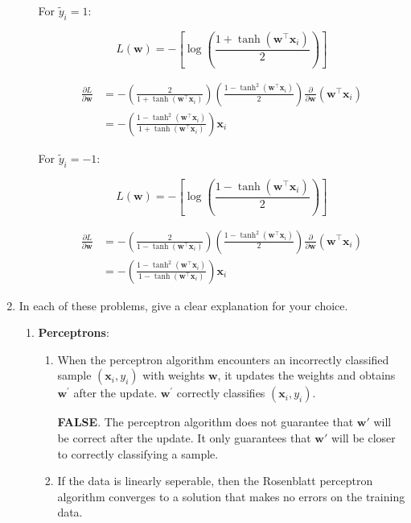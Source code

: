 \documentclass[letterpaper]{article}
\theoremstyle{definition}
\begin{document}
\begin{enumerate}
\begin{enumerate}
For \(\tilde{y}_i = 1\):

$$
      L(\mathbf{w}) = -\left[ \log \left(\frac{1+\tanh(\mathbf{w}^\top \mathbf{x}_i)}{2}\right)\right]
      $$

\begin{align*}
\frac{\partial L}{\partial \mathbf{w}} & = -\left( \frac{2}{1 + \tanh(\mathbf{w}^\top \mathbf{x}_i)} \right) \left(\frac{1 - \tanh^2(\mathbf{w}^\top \mathbf{x}_i)}{2}\right) \frac{\partial}{\partial \mathbf{w}} (\mathbf{w}^\top \mathbf{x}_i) \\
& = -\left( \frac{1 - \tanh^2(\mathbf{w}^\top \mathbf{x}_i)}{1 + \tanh(\mathbf{w}^\top \mathbf{x}_i)} \right) \mathbf{x}_i
\end{align*}

For \(\tilde{y}_i = -1\):

$$
      L(\mathbf{w}) = -\left[ \log \left(\frac{1-\tanh(\mathbf{w}^\top \mathbf{x}_i)}{2}\right)\right]
      $$

\begin{align*}
\frac{\partial L}{\partial \mathbf{w}} & = -\left( \frac{2}{1 - \tanh(\mathbf{w}^\top \mathbf{x}_i)} \right) \left(\frac{1 - \tanh^2(\mathbf{w}^\top \mathbf{x}_i)}{2}\right) \frac{\partial}{\partial \mathbf{w}} (\mathbf{w}^\top \mathbf{x}_i) \\
& = -\left( \frac{1 - \tanh^2(\mathbf{w}^\top \mathbf{x}_i)}{1 - \tanh(\mathbf{w}^\top \mathbf{x}_i)} \right) \mathbf{x}_i
\end{align*}
\end{enumerate}

\item In each of these problems, give a clear explanation for your choice.

\begin{enumerate}
\item \textbf{Perceptrons}:

\begin{enumerate}
\item When the perceptron algorithm encounters an incorrectly classified sample \(\left(\mathbf{x}_{i}, y_{i}\right)\) with weights \(\mathbf{w}\), it updates the weights and obtains \(\mathbf{w}^{\prime}\) after the update. \(\mathbf{w}^{\prime}\) correctly classifies \(\left(\mathbf{x}_{i}, y_{i}\right)\).

\color{teal}
\textbf{FALSE}. The perceptron algorithm does not guarantee that \(\mathbf{w}'\) will be correct
after the update. It only guarantees that \(\mathbf{w}'\) will be closer to correctly
classifying a sample.
\color{black}
\item If the data is linearly seperable, then the Rosenblatt perceptron algorithm converges to a solution that makes no errors on the training data.


\end{enumerate}
\end{enumerate}
\end{enumerate}
\end{document}
